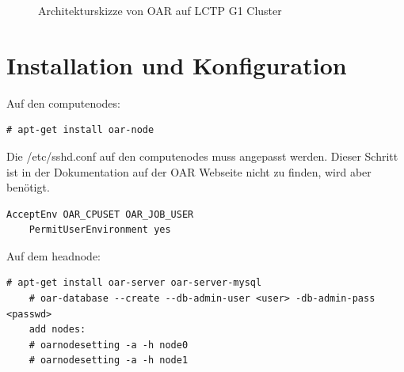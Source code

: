     \begin{figure}[h]
    \centering
{}
    \caption{Architekturskizze von OAR auf LCTP G1 Cluster} 
\end{figure}
\newpage

\section{Installation und Konfiguration}
    Auf den computenodes:
    \begin{lstlisting}[style=Bash]
    # apt-get install oar-node
	\end{lstlisting}
    Die /etc/sshd.conf auf den computenodes muss angepasst werden.
    Dieser Schritt ist in der Dokumentation auf der OAR Webseite nicht zu finden, wird aber benötigt.
    \begin{lstlisting}[style=Bash]
    AcceptEnv OAR_CPUSET OAR_JOB_USER
    PermitUserEnvironment yes
	\end{lstlisting}
    Auf dem headnode:
    \begin{lstlisting}[style=Bash]
    # apt-get install oar-server oar-server-mysql
    # oar-database --create --db-admin-user <user> -db-admin-pass <passwd>
    add nodes:
    # oarnodesetting -a -h node0
    # oarnodesetting -a -h node1
	\end{lstlisting}
